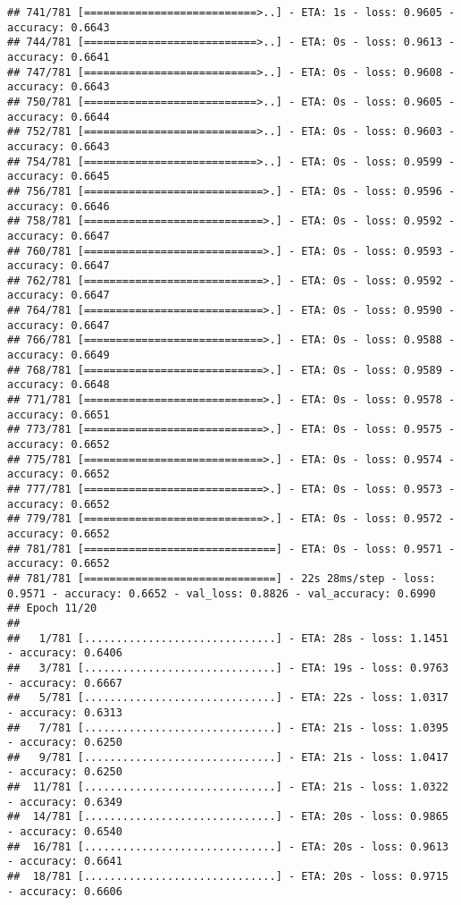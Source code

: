 \documentclass[
]{article}
\begin{document}
\begin{verbatim}
## 741/781 [===========================>..] - ETA: 1s - loss: 0.9605 - accuracy: 0.6643
## 744/781 [===========================>..] - ETA: 0s - loss: 0.9613 - accuracy: 0.6641
## 747/781 [===========================>..] - ETA: 0s - loss: 0.9608 - accuracy: 0.6643
## 750/781 [===========================>..] - ETA: 0s - loss: 0.9605 - accuracy: 0.6644
## 752/781 [===========================>..] - ETA: 0s - loss: 0.9603 - accuracy: 0.6643
## 754/781 [===========================>..] - ETA: 0s - loss: 0.9599 - accuracy: 0.6645
## 756/781 [============================>.] - ETA: 0s - loss: 0.9596 - accuracy: 0.6646
## 758/781 [============================>.] - ETA: 0s - loss: 0.9592 - accuracy: 0.6647
## 760/781 [============================>.] - ETA: 0s - loss: 0.9593 - accuracy: 0.6647
## 762/781 [============================>.] - ETA: 0s - loss: 0.9592 - accuracy: 0.6647
## 764/781 [============================>.] - ETA: 0s - loss: 0.9590 - accuracy: 0.6647
## 766/781 [============================>.] - ETA: 0s - loss: 0.9588 - accuracy: 0.6649
## 768/781 [============================>.] - ETA: 0s - loss: 0.9589 - accuracy: 0.6648
## 771/781 [============================>.] - ETA: 0s - loss: 0.9578 - accuracy: 0.6651
## 773/781 [============================>.] - ETA: 0s - loss: 0.9575 - accuracy: 0.6652
## 775/781 [============================>.] - ETA: 0s - loss: 0.9574 - accuracy: 0.6652
## 777/781 [============================>.] - ETA: 0s - loss: 0.9573 - accuracy: 0.6652
## 779/781 [============================>.] - ETA: 0s - loss: 0.9572 - accuracy: 0.6652
## 781/781 [==============================] - ETA: 0s - loss: 0.9571 - accuracy: 0.6652
## 781/781 [==============================] - 22s 28ms/step - loss: 0.9571 - accuracy: 0.6652 - val_loss: 0.8826 - val_accuracy: 0.6990
## Epoch 11/20
## 
##   1/781 [..............................] - ETA: 28s - loss: 1.1451 - accuracy: 0.6406
##   3/781 [..............................] - ETA: 19s - loss: 0.9763 - accuracy: 0.6667
##   5/781 [..............................] - ETA: 22s - loss: 1.0317 - accuracy: 0.6313
##   7/781 [..............................] - ETA: 21s - loss: 1.0395 - accuracy: 0.6250
##   9/781 [..............................] - ETA: 21s - loss: 1.0417 - accuracy: 0.6250
##  11/781 [..............................] - ETA: 21s - loss: 1.0322 - accuracy: 0.6349
##  14/781 [..............................] - ETA: 20s - loss: 0.9865 - accuracy: 0.6540
##  16/781 [..............................] - ETA: 20s - loss: 0.9613 - accuracy: 0.6641
##  18/781 [..............................] - ETA: 20s - loss: 0.9715 - accuracy: 0.6606

\end{verbatim}
\end{document}
